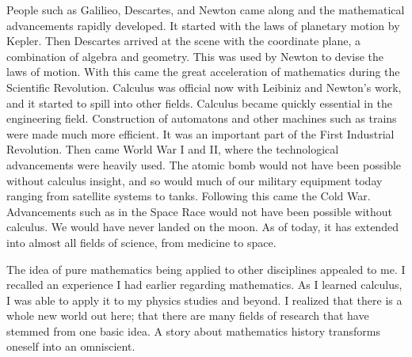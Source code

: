 \documentclass{article}
\begin{document}
People such as Galilieo, Descartes, and Newton came along and the mathematical
advancements rapidly developed. It started with the laws of planetary motion by Kepler. Then
Descartes arrived at the scene with the coordinate plane, a combination of algebra and
geometry. This was used by Newton to devise the laws of motion. With this came the great
acceleration of mathematics during the Scientific Revolution. Calculus was official now with
Leibiniz and Newton’s work, and it started to spill into other fields.
Calculus became quickly essential in the engineering field. Construction of automatons and
other machines such as trains were made much more efficient. It was an important part of the
First Industrial Revolution. Then came World War I and II, where the technological
advancements were heavily used. The atomic bomb would not have been possible without
calculus insight, and so would much of our military equipment today ranging from satellite
systems to tanks. Following this came the Cold War. Advancements such as in the Space Race
would not have been possible without calculus. We would have never landed on the moon. As
of today, it has extended into almost all fields of science, from medicine to space.

The idea of pure mathematics being applied to other disciplines appealed to me. I recalled an
experience I had earlier regarding mathematics. As I learned calculus, I was able to apply it to
my physics studies and beyond. I realized that there is a whole new world out here; that there
are many fields of research that have stemmed from one basic idea. A story about mathematics
history transforms oneself into an omniscient.
\end{document}
